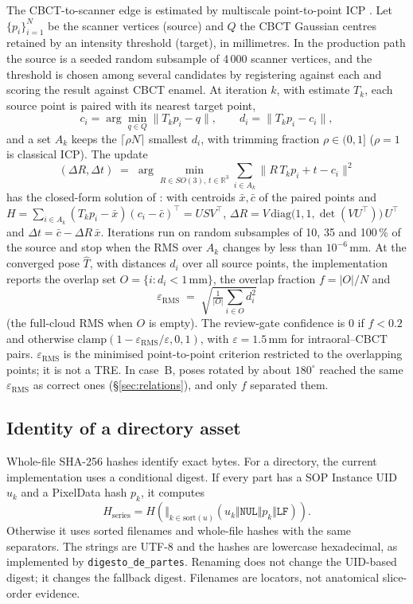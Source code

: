 \documentclass[11pt,a4paper]{article}
\newcommand{\code}[1]{\texttt{\small #1}}
\begin{document}
The CBCT-to-scanner edge is estimated by multiscale point-to-point ICP \cite{besl1992}. Let
$\{p_i\}_{i=1}^{N}$ be the scanner vertices (source) and $Q$ the CBCT Gaussian centres
retained by an intensity threshold (target), in millimetres. In the production path the
source is a seeded random subsample of 4\,000 scanner vertices, and the threshold is chosen
among several candidates by registering against each and scoring the result against CBCT
enamel. At iteration $k$, with
estimate $T_k$, each source point is paired with its nearest target point,
\[
  c_i = \arg\min_{q\in Q}\lVert T_k p_i - q\rVert, \qquad d_i = \lVert T_k p_i - c_i\rVert,
\]
and a set $A_k$ keeps the $\lceil \rho N\rceil$ smallest $d_i$, with trimming fraction
$\rho\in(0,1]$ ($\rho=1$ is classical ICP). The update
\[
  (\Delta R,\Delta t) \;=\; \arg\min_{R\in SO(3),\,t\in\mathbb{R}^3}
  \sum_{i\in A_k}\big\lVert R\,T_k p_i + t - c_i\big\rVert^2
\]
has the closed-form solution of \cite{kabsch1976}: with centroids $\bar x,\bar c$ of the paired points and
$H=\sum_{i\in A_k}(T_k p_i-\bar x)(c_i-\bar c)^{\!\top}=U S V^{\!\top}$,
$\Delta R = V\,\mathrm{diag}\big(1,1,\det(VU^{\!\top})\big)\,U^{\!\top}$ and
$\Delta t=\bar c-\Delta R\,\bar x$. Iterations run on random subsamples of 10, 35 and
100\,\% of the source and stop when the RMS over $A_k$ changes by less than
$10^{-6}$\,mm. At the converged pose $\hat T$, with distances $d_i$ over all source points,
the implementation reports the overlap set $O=\{i : d_i<1\,\mathrm{mm}\}$, the overlap
fraction $f=|O|/N$ and
\[
  \varepsilon_{\mathrm{RMS}} \;=\; \sqrt{\tfrac{1}{|O|}\textstyle\sum_{i\in O} d_i^{2}}
\]
(the full-cloud RMS when $O$ is empty). The review-gate confidence is $0$ if $f<0.2$ and
otherwise $\mathrm{clamp}(1-\varepsilon_{\mathrm{RMS}}/\varepsilon,0,1)$, with
$\varepsilon=1.5$\,mm for intraoral--CBCT pairs. $\varepsilon_{\mathrm{RMS}}$ is the
minimised point-to-point criterion restricted to the overlapping points; it is not a TRE.
In case~B, poses rotated by about $180^\circ$ reached the same $\varepsilon_{\mathrm{RMS}}$
as correct ones (\S\ref{sec:relations}), and only $f$ separated them.


\subsection{Identity of a directory asset}\label{app:hash}

Whole-file SHA-256 hashes identify exact bytes. For a directory, the current implementation
uses a conditional digest. If every part has a SOP Instance UID $u_k$ and a PixelData hash
$p_k$, it computes
\[
 H_{\mathrm{series}} = H\!\left(\big\Vert_{k\in\mathrm{sort}(u)}
 (u_k\Vert\texttt{NUL}\Vert p_k\Vert\texttt{LF})\right).
\]
Otherwise it uses sorted filenames and whole-file hashes with the same separators.
The strings are UTF-8 and the hashes are lowercase hexadecimal, as implemented by
\code{digesto\_de\_partes}. Renaming does not change the UID-based digest; it changes the
fallback digest. Filenames are locators, not anatomical slice-order evidence.
\end{document}
